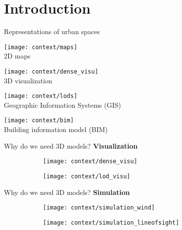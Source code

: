 \section{Introduction}

\begin{frame}{Representations of urban spaces}
	\centering
	\scriptsize
	\begin{minipage}{0.5\linewidth}
		\centering
		\texttt{[image: context/maps]}\\
		2D maps
	\end{minipage}%
	\pause%
	\begin{minipage}{0.5\linewidth}
		\centering
		\texttt{[image: context/dense\_visu]}\\
		3D visualization
	\end{minipage}%
	\pause
	
	\begin{minipage}{0.5\linewidth}
		\centering
		\texttt{[image: context/lods]}\\
		Geographic Information Systems (GIS)
	\end{minipage}%
	\pause%
	\begin{minipage}{0.5\linewidth}
		\centering
		\texttt{[image: context/bim]}\\
		Building information model (BIM)
	\end{minipage}
\end{frame}

\begin{frame}[t]{Why do we need 3D models?}
	\textbf{Visualization}
	\vfill
	\begin{figure}
		\centering
		\begin{subfigure}[t]{0.45\linewidth}
			\texttt{[image: context/dense\_visu]}
		\end{subfigure}
		\hfill%
		\begin{subfigure}[t]{0.45\linewidth}
			\texttt{[image: context/lod\_visu]}
		\end{subfigure}
	\end{figure}
\end{frame}

\begin{frame}[t]{Why do we need 3D models?}
	\textbf{Simulation}
	\vfill
	\begin{figure}
		\centering
		\begin{subfigure}[t]{0.45\linewidth}
			\texttt{[image: context/simulation\_wind]}
		\end{subfigure}
		\hfill%
		\begin{subfigure}[t]{0.45\linewidth}
			\texttt{[image: context/simulation\_lineofsight]}
		\end{subfigure}
	\end{figure}
\end{frame}

